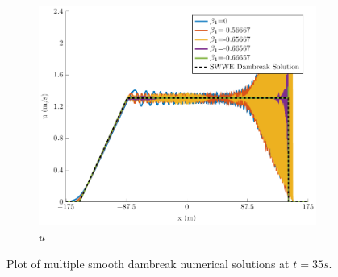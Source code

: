 \documentclass[10pt]{article}
\begin{document}
\begin{figure}
\begin{subfigure}{0.32\textwidth}
	\includegraphics[width=\textwidth]{./Figures/Simulations/Study/Serre2SWWECloser/u.pdf}
	\caption{$u$}
	\end{subfigure}
	\caption{Plot of multiple smooth dambreak numerical solutions at $t=35s$.}
\end{figure}
\end{document}
